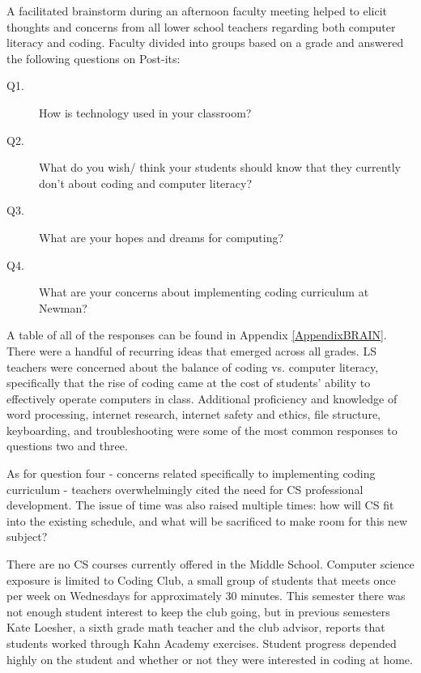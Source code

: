 A facilitated brainstorm during an afternoon faculty meeting helped to elicit thoughts and concerns from all lower school teachers regarding both computer literacy and coding. Faculty divided into groups based on a grade and answered the following questions on Post-its: \par
\begin{description}
	\item [Q1.] How is technology used in your classroom?
	\item [Q2.] What do you wish/ think your students should know that they currently don't about coding and computer literacy?
	\item [Q3.] What are your hopes and dreams for computing? 
	\item [Q4.] What are your concerns about implementing coding curriculum at Newman?
\end{description}
A table of all of the responses can be found in Appendix \ref{AppendixBRAIN}. There were a handful of recurring ideas that emerged across all grades. LS teachers were concerned about the balance of coding vs. computer literacy, specifically that the rise of coding came at the cost of students' ability to effectively operate computers in class. Additional proficiency and knowledge of word processing, internet research, internet safety and ethics, file structure, keyboarding, and troubleshooting were some of the most common responses to questions two and three. \par
As for question four - concerns related specifically to implementing coding curriculum - teachers overwhelmingly cited the need for CS professional development. The issue of time was also raised multiple times: how will CS fit into the existing schedule, and what will be sacrificed to make room for this new subject? \par


There are no CS courses currently offered in the Middle School. Computer science exposure is limited to Coding Club, a small group of students that meets once per week on Wednesdays for approximately 30 minutes. This semester there was not enough student interest to keep the club going, but in previous semesters Kate Loesher, a sixth grade math teacher and the club advisor, reports that students worked through Kahn Academy exercises. Student progress depended highly on the student and whether or not they were interested in coding at home. \par

